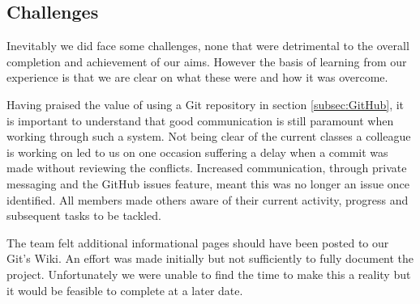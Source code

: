 \subsection{Challenges}
Inevitably we did face some challenges, none that were detrimental to the overall completion and achievement of our aims. However the basis of learning from our experience is that we are clear on what these were and how it was overcome. 

Having praised the value of using a Git repository in section \ref{subsec:GitHub}, it is important to understand that good communication is still paramount when working through such a system. Not being clear of the current classes a colleague is working on led to us on one occasion suffering a delay when a commit was made without reviewing the conflicts. Increased communication, through private messaging and the GitHub issues feature, meant this was no longer an issue once identified. All members made others aware of their current activity, progress and subsequent tasks to be tackled.

The team felt additional informational pages should have been posted to our Git's Wiki. An effort was made initially but not sufficiently to fully document the project. Unfortunately we were unable to find the time to make this a reality but it would be feasible to complete at a later date.
